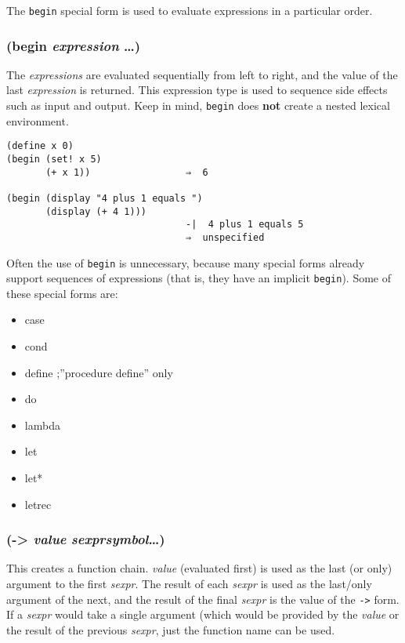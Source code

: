 \documentclass{article}
\begin{document}
The \verb|begin| special form is used to evaluate expressions in a particular order.

\subsubsection{(begin \emph{expression} \ldots{})}

The \emph{expressions} are evaluated sequentially from left to right, and the value of the
last \emph{expression} is returned. This expression type is used to sequence side effects such
as input and output. Keep in mind, \verb|begin| does \textbf{not} create a nested lexical
environment.

\begin{verbatim}
(define x 0)
(begin (set! x 5)
       (+ x 1))                 ⇒  6

(begin (display "4 plus 1 equals ")
       (display (+ 4 1)))
                                -|  4 plus 1 equals 5
                                ⇒  unspecified
\end{verbatim}

Often the use of \verb|begin| is unnecessary, because many special forms already support
sequences of expressions (that is, they have an implicit \verb|begin|). Some of these
special forms are:

\begin{itemize}
\item case
\item cond
\item define          ;''procedure define'' only
\item do
\item lambda
\item let
\item let*
\item letrec
\end{itemize}

\subsubsection{(-\textgreater{} \emph{value} \emph{sexpr}\textbar{}\emph{symbol}\ldots{})}

This creates a function chain. \emph{value} (evaluated first) is used as the last (or only) argument to
the first \emph{sexpr}. The result of each \emph{sexpr} is used as the last/only argument of the
next, and the result of the final \emph{sexpr} is the value of the \verb|->|
form. If a \emph{sexpr} would take a single argument (which would be provided by the
\emph{value} or the result of the previous \emph{sexpr}, just the function name can be used.
\end{document}

